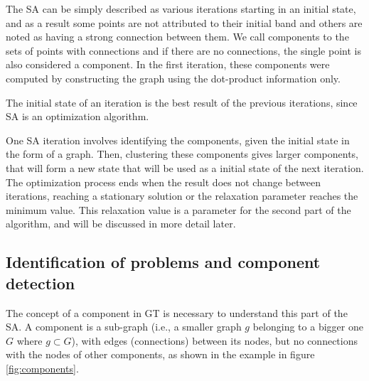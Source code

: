 \documentclass[a4paper,12pt]{report}
\begin{document}
\begin{appendices}
The SA can be simply described as various iterations starting in an initial state, and as a result some points are not attributed to their initial band and others are noted as having a strong connection between them.
We call components to the sets of points with connections and if there are no connections, the single point is also considered a component.
In the first iteration, these components were computed by constructing the graph using the dot-product information only.

The initial state of an iteration is the best result of the previous iterations, since SA  is an optimization algorithm.

One SA iteration involves identifying the components, given the initial state in the form of a graph.
Then, clustering these components gives larger components, that will form a new state that will be used as a initial state of the next iteration.
The optimization process ends when the result does not change between iterations, reaching a stationary solution or the relaxation parameter reaches the minimum value.
This relaxation value is a parameter for the second part of the algorithm, and will be discussed in more detail later.


\subsection{Identification of problems and component detection}

The concept of a component in GT is necessary to understand this part of the SA.
A component is a sub-graph (i.e., a smaller graph $g$ belonging to a bigger one $G$ where $g\subset G$), with edges (connections) between its nodes, but no connections with the nodes of other components, as shown in the example in figure \ref{fig:components}.



\end{appendices}
\end{document}
